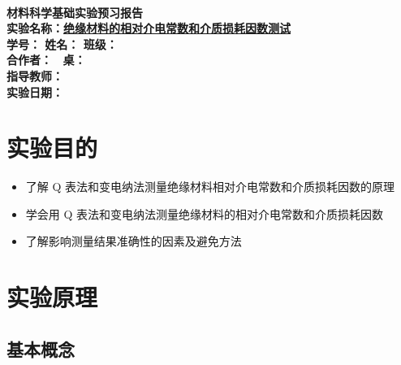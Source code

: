 \documentclass[a4paper,utf8]{article}
\begin{document}
\begin{center}
    {\mbox{}\\[7em]\bfseries\songti%
    材料科学基础实验预习报告}\\[34mm]
    {\bfseries\songti
    实验名称：\uline{\hfill\mbox{绝缘材料的相对介电常数和介质损耗因数测试}\hfill} \\[2.9mm]
    学\quad 号：\uline{}\hfill
    姓\quad 名：\uline{}\hfill
    班\quad 级：\uline{} \\[2.9mm]
    合作者：\uline{\makebox[25mm]{}}\enspace~
    桌：\uline{\makebox[25mm]{}}\hfill\mbox{}\\[2.9mm]
    指导教师：\uline{}\hfill\mbox{} \\[2.9mm]
    实验日期：\uline{\makebox[30mm]{}}\hfill\mbox{} \\[58.7mm]
    }
\end{center}
\newpage
\section{实验目的}
    \begin{itemize}
        \item 了解 Q 表法和变电纳法测量绝缘材料相对介电常数和介质损耗因数的原理
        \item 学会用 Q 表法和变电纳法测量绝缘材料的相对介电常数和介质损耗因数
        \item 了解影响测量结果准确性的因素及避免方法
    \end{itemize}
\section{实验原理}%
    \subsection{基本概念}
\end{document}
